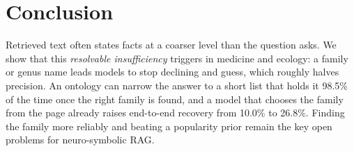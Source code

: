 \section{Conclusion}

Retrieved text often states facts at a coarser level than the question asks. We show that this \emph{resolvable insufficiency} triggers \clade{} in medicine and ecology: a family or genus name leads models to stop declining and guess, which roughly halves precision. An ontology can narrow the answer to a short list that holds it 98.5\% of the time once the right family is found, and a model that chooses the family from the page already raises end-to-end recovery from 10.0\% to 26.8\%. Finding the family more reliably and beating a popularity prior remain the key open problems for neuro-symbolic RAG.
